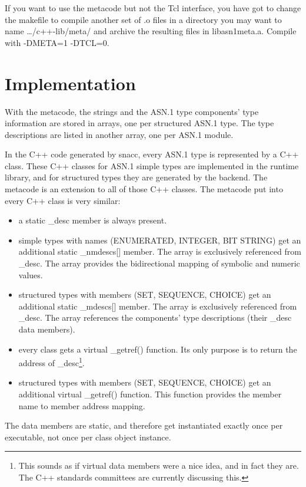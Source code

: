 If you want to use the metacode but not the Tcl interface, you have got to change the makefile to compile another set of {\ufn .o} files in a directory you may want to name {\ufn \dots/c++-lib/meta/} and archive the resulting files in {\ufn libasn1meta.a}.
Compile with {\ufn -DMETA=1 -DTCL=0}.

\section{Implementation}

With the metacode, the strings and the ASN.1 type components' type information are stored in arrays, one per structured ASN.1 type.
The type descriptions are listed in another array, one per ASN.1 module.

In the C++ code generated by snacc, every ASN.1 type is represented by a C++ class.
These C++ classes for ASN.1 simple types are implemented in the runtime library, and for structured types they are generated by the backend.
The metacode is an extension to all of those C++ classes.
The metacode put into every C++ class is very similar:
\begin{itemize}
  \item a static {\C \_desc} member is always present.
  \item simple types with names (ENUMERATED, INTEGER, BIT STRING) get an additional static {\C \_nmdescs[]} member.
    The array is exclusively referenced from {\C \_desc}.
    The array provides the bidirectional mapping of symbolic and numeric values.
  \item structured types with members (SET, SEQUENCE, CHOICE) get an additional static {\C \_mdescs[]} member.
    The array is exclusively referenced from {\C \_desc}.
    The array references the components' type descriptions (their {\C \_desc} data members).
  \item every class gets a virtual {\C \_getref()} function.
    Its only purpose is to return the address of {\C \_desc}\footnote{
      This sounds as if virtual data members were a nice idea, and in fact they are.
      The C++ standards committees are currently discussing this.
    }.
  \item structured types with members (SET, SEQUENCE, CHOICE) get an additional virtual {\C \_getref()} function.
    This function provides the member name to member address mapping.
\end{itemize}
The data members are {\C static}, and therefore get instantiated exactly once per executable, not once per class object instance.

